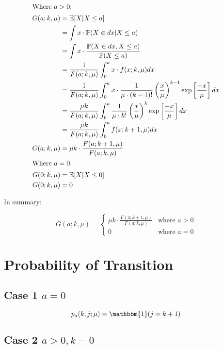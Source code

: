 \documentclass{article}
\begin{document}
\begin{align*}
	\intertext{Where $a > 0$:}
	G (a; k, \mu) & = \mathbb{E} [X | X \leq a] \\
	& = \int x \cdot \mathbb{P} (X \in dx | X \leq a) \\
	& = \int x \cdot \frac{\mathbb{P} (X \in dx, X \leq a)}{\mathbb{P} (X \leq a)} \\
	& = \frac{1}{F (a; k, \mu)} \int_{0}^{a} x \cdot f (x; k, \mu) d x \\
	& = \frac{1}{F (a; k, \mu)} \int_{0}^{a} x \cdot \frac{1}{\mu \cdot (k - 1)!} \left( \frac{x}{\mu} \right)^{k - 1} \exp \left[ \frac{-x}{\mu} \right] d x \\
	& = \frac{\mu k}{F (a; k, \mu)} \int_{0}^{a} \frac{1}{\mu \cdot k!} \left( \frac{x}{\mu} \right)^{k} \exp \left[ \frac{-x}{\mu} \right] d x \\
	& = \frac{\mu k}{F (a; k, \mu)} \int_{0}^{a} f (x; k + 1, \mu) d x \\
	G (a; k, \mu) & = \mu k \cdot \frac{F (a; k + 1, \mu)}{F (a; k, \mu)} \\
	\intertext{Where $a = 0$:}
	G (0; k, \mu) & = \mathbb{E} [X | X \leq 0] \\
	G (0; k, \mu) & = 0 \\
\end{align*}

In summary:

\begin{equation}
	G (a; k, \mu) = \begin{cases} \mu k \cdot \frac{F (a; k + 1, \mu)}{F (a; k, \mu)} & \text{where $a > 0$} \\
							0 & \text{where $a = 0$} \end{cases}
\end{equation}

\section{Probability of Transition}

\subsection{Case 1 $a = 0$}

\begin{equation*}
	p_{a} (k, j; \mu) = \mathbbm{1} (j = k + 1) \\
\end{equation*}

\subsection{Case 2 $a > 0, k = 0$}
\end{document}
